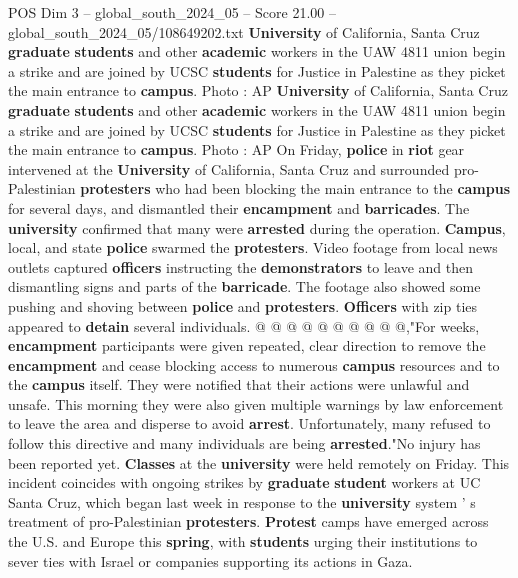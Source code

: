 \begin{textsample}{POS Dim 3 – global\_south\_2024\_05 – Score 21.00 – global\_south\_2024\_05/108649202.txt}  \label{ex:f3_pos_108}
\textbf{University} of California, Santa Cruz \textbf{graduate} \textbf{students} and other \textbf{academic} workers in the UAW 4811 union begin a strike and are joined by UCSC \textbf{students} for Justice in Palestine as they picket the main entrance to \textbf{campus}.
Photo : AP \textbf{University} of California, Santa Cruz \textbf{graduate} \textbf{students} and other \textbf{academic} workers in the UAW 4811 union begin a strike and are joined by UCSC \textbf{students} for Justice in Palestine as they picket the main entrance to \textbf{campus}.
Photo : AP On Friday, \textbf{police} in \textbf{riot} gear intervened at the \textbf{University} of California, Santa Cruz and surrounded pro- Palestinian \textbf{protesters} who had been blocking the main entrance to the \textbf{campus} for several days, and dismantled their \textbf{encampment} and \textbf{barricades}.
The \textbf{university} confirmed that many were \textbf{arrested} during the operation. \textbf{Campus}, local, and state \textbf{police} swarmed the \textbf{protesters}.
Video footage from local news outlets captured \textbf{officers} instructing the \textbf{demonstrators} to leave and then dismantling signs and parts of the \textbf{barricade}.
The footage also showed some pushing and shoving between \textbf{police} and \textbf{protesters}. \textbf{Officers} with zip ties appeared to \textbf{detain} several individuals. @ @ @ @ @ @ @ @ @ @,"For weeks, \textbf{encampment} participants were given repeated, clear direction to remove the \textbf{encampment} and cease blocking access to numerous \textbf{campus} resources and to the \textbf{campus} itself.
They were notified that their actions were unlawful and unsafe.
This morning they were also given multiple warnings by law enforcement to leave the area and disperse to avoid \textbf{arrest}.
Unfortunately, many refused to follow this directive and many individuals are being \textbf{arrested}."No injury has been reported yet. \textbf{Classes} at the \textbf{university} were held remotely on Friday.
This incident coincides with ongoing strikes by \textbf{graduate} \textbf{student} workers at UC Santa Cruz, which began last week in response to the \textbf{university} system ' s treatment of pro-Palestinian \textbf{protesters}. \textbf{Protest} camps have emerged across the U.S. and Europe this \textbf{spring}, with \textbf{students} urging their institutions to sever ties with Israel or companies supporting its actions in Gaza.

\end{textsample}
